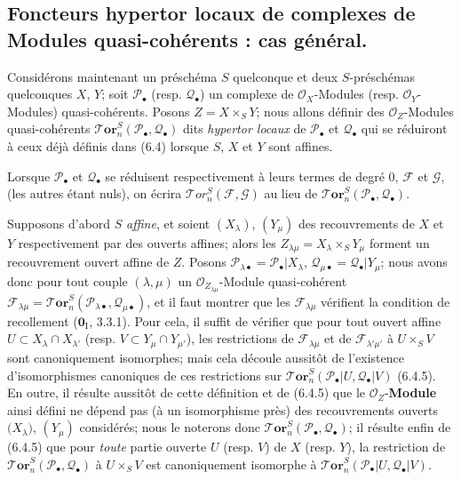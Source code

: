 \subsection{Foncteurs hypertor locaux de complexes de Modules quasi-cohérents : cas général.}

\begin{env}[6.5.1]
Considérons maintenant un préschéma $S$ quelconque et deux $S$-préschémas
quelconques $X$, $Y$; soit $\mathscr P_\bullet$ (resp. $\mathscr Q_\bullet$)
un complexe de $\mathscr O_X$-Modules (resp. $\mathscr O_Y$-Modules)
quasi-cohérents. Posons $Z=X\times_S Y$; nous allons définir des
$\mathscr O_Z$-Modules quasi-cohérents
$\boldsymbol{\mathscr{T}\!or}_n^S(\mathscr P_\bullet,\mathscr Q_\bullet)$ dits
\emph{hypertor locaux} de $\mathscr P_\bullet$ et $\mathscr Q_\bullet$ qui se
réduiront à ceux déjà définis dans (6.4) lorsque $S$, $X$ et $Y$ sont affines.

Lorsque $\mathscr P_\bullet$ et $\mathscr Q_\bullet$ se réduisent
respectivement à leurs termes de degré 0, $\mathscr F$ et $\mathscr G$, (les
autres étant nuls), on écrira
$\mathscr{T}\!or_n^S(\mathscr F,\mathscr G)$ au lieu de
$\boldsymbol{\mathscr{T}\!or}_n^S(\mathscr P_\bullet,\mathscr Q_\bullet)$.
\end{env}

\begin{env}[6.5.2]
Supposons d'abord $S$ \emph{affine}, et soient $(X_\lambda)$, $(Y_\mu)$ des
recouvrements de $X$ et $Y$ respectivement par des ouverts affines; alors les
$Z_{\lambda\mu}=X_\lambda\times_S Y_\mu$ forment un recouvrement ouvert affine
de $Z$. Posons
$\mathscr P_{\lambda\bullet}=\mathscr P_\bullet|X_\lambda$,
$\mathscr Q_{\mu\bullet}=\mathscr Q_\bullet|Y_\mu$; nous avons donc pour tout
couple $(\lambda,\mu)$ un $\mathscr O_{Z_{\lambda\mu}}$-Module quasi-cohérent
$\mathscr F_{\lambda\mu}
  =\boldsymbol{\mathscr{T}\!or}_n^S
   (\mathscr P_{\lambda\bullet},\mathscr Q_{\mu\bullet})$,
et il faut montrer que les $\mathscr F_{\lambda\mu}$ vérifient la condition de
recollement ($\mathbf{0}_{\mathrm I}$, 3.3.1). Pour cela, il suffit de vérifier que pour
tout ouvert affine $U\subset X_\lambda\cap X_{\lambda'}$ (resp.
$V\subset Y_\mu\cap Y_{\mu'}$), les restrictions de
$\mathscr F_{\lambda\mu}$ et de $\mathscr F_{\lambda'\mu'}$ à $U\times_S V$
sont canoniquement isomorphes; mais cela découle aussitôt de l'existence
d'isomorphismes canoniques de ces restrictions sur
$\boldsymbol{\mathscr{T}\!or}_n^S(\mathscr P_\bullet|U,\mathscr Q_\bullet|V)$ (6.4.5). En
outre, il résulte aussitôt de cette définition et de (6.4.5) que le
$\mathscr O_Z$-\textbf{Module} ainsi défini ne dépend pas (à un isomorphisme près) des
recouvrements ouverts $\boldsymbol{(}X_\lambda)$, $(Y_\mu)$ considérés;
nous le noterons donc
$\boldsymbol{\mathscr{T}\!or}_n^S(\mathscr P_\bullet,\mathscr Q_\bullet)$; il résulte enfin
de (6.4.5) que pour \emph{toute} partie ouverte $U$ (resp. $V$) de $X$ (resp. $Y$), la
restriction de $\boldsymbol{\mathscr{T}\!or}_n^S(\mathscr P_\bullet,\mathscr Q_\bullet)$ à
$U\times_S V$ est canoniquement isomorphe à
$\boldsymbol{\mathscr{T}\!or}_n^S(\mathscr P_\bullet|U,\mathscr Q_\bullet|V)$.
\end{env}

